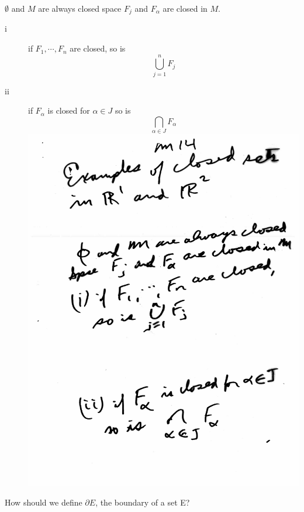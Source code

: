 \documentclass[10pt,a4paper]{article}
\begin{document}
{{\begin{flushleft}
$\emptyset$ and $M$ are always closed space $F_j$ and $F_{\alpha}$ are closed in $M$.
\begin{description}
\item[i] if $F_1, \cdots, F_n$ are closed, so is $$ \bigcup^n_{j=1} F_j$$
\item[ii] if $F_\alpha$ is closed for $\alpha \in J$ so is $$\bigcap_{\alpha \in J} F_\alpha$$
\includegraphics[scale=.5]{Pages/MS_14}
\end{description}
\newpage
How should we define $\partial E$, the boundary of a set E?


\end{flushleft}}}
\end{document}
